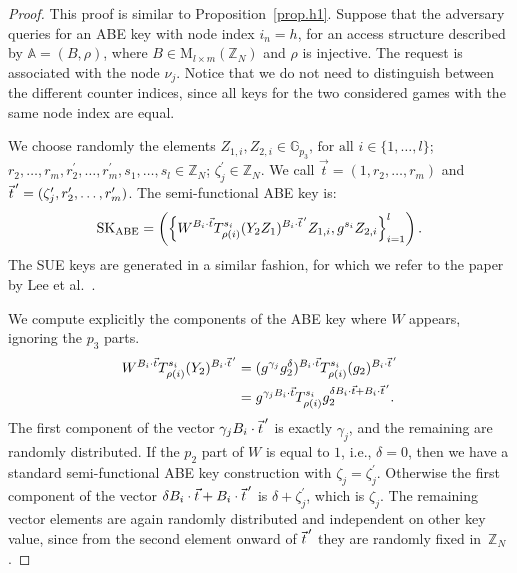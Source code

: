 \documentclass[a4paper,10pt]{article}
\newcommand{\G}{\mathbb{G}}
\newcommand{\Z}{\mathbb{Z}}
\newcommand{\varRow}{l}
\newcommand{\varColumn}{m}
\newcommand{\pvec}[2][]{{\hspace{-0.05em}\vec{\hspace{0.05em}#2}\mkern2mu\vphantom{#2}}^\prime_{\hspace{-0.18em}#1}}
\newcommand{\matrixset}[3]{\text{M}_{#1\times #2}(#3)}
\newcommand{\randomchoose}[1]{We choose randomly the element\ifstrequal{#1}{s}{}{s} }
\newcommand{\disclaimerSUE}{The SUE keys are generated in a similar fashion, for which we refer to the paper by Lee et al.~\cite{lee2013RSABE}.

}
\begin{document}
	\begin{proof}
		This proof is similar to Proposition~\ref{prop.h1}.
		Suppose that the adversary queries for an ABE key with node index $i_n=h$, for an access structure described by $\mathbb{A}=(B,\rho)$, where $B\in\matrixset{\varRow}{\varColumn}{\Z_N}$ and $\rho$ is injective. The request is associated with the node $\nu_j$. Notice that we do not need to distinguish between the different counter indices, since all keys for the two considered games with the same node index are equal.
		
		\randomchoose{p}{$Z_{1,i},Z_{2,i}\in\G_{p_3}\text{, for all }i\in \{1,\ldots,\varRow\}$;
			\linebreak$r_{2},\ldots,r_{\varColumn},r^\prime_{2},\ldots,r^\prime_{\varColumn},s_1,\ldots,s_\varRow\in \Z_N$;
			$\zeta^\prime_j\in \Z_N$.
		}		
		We call $\vec{t}=(1,r_2,\ldots,r_\varColumn)$ and $\pvec{t}=(\zeta^\prime_j,r^\prime_2,\ldots,r^\prime_\varColumn)$.		
		The semi-functional ABE key is:
		\[
			\mathrm{SK}_{\textnormal{ABE}}=
			\left(\left\{
			W^{B_i\cdot \vec{t}}T_{\rho(i)}^{s_i}(Y_2Z_1)^{B_i\cdot \pvec{t}}Z_{1,i},
			g^{s_i}Z_{2,i}\right
			\}_{i=1}^{\varRow}\right).
		\]		
		\disclaimerSUE{}
We compute explicitly the components of the ABE key where $W$ appears, ignoring the $p_3$ parts.
		\begin{align*}
			W^{B_i\cdot \vec{t}}T_{\rho(i)}^{s_i}(Y_2)^{B_i\cdot \pvec{t}}
			&=(g^{\gamma_j} g_2^{\delta})^{B_i\cdot \vec{t}}T_{\rho(i)}^{s_i}(g_2)^{B_i\cdot \pvec{t}}\\
			&=g^{\gamma_j B_i\cdot \vec{t}} T_{\rho(i)}^{s_i} g_2^{\delta B_i\cdot \vec{t}+B_i\cdot \pvec{t}}.
		\end{align*}
		The first component of the vector $\gamma_j B_i\cdot \pvec{t}$ is exactly $\gamma_j$, and the remaining are randomly distributed. If the $p_2$ part of $W$ is equal to $1$, i.e., $\delta=0$, then we have a standard semi-functional ABE key construction with $\zeta_j=\zeta^\prime_j$. Otherwise the first component of the vector $\delta B_i\cdot \vec{t}+B_i\cdot \pvec{t}$ is $\delta + \zeta^\prime_j$, which is $\zeta_j$. The remaining vector elements are again randomly distributed and independent on other key value, since from the second element onward of $\pvec{t}$ they are randomly fixed in~$\Z_N$.
		
\end{proof}
\end{document}
